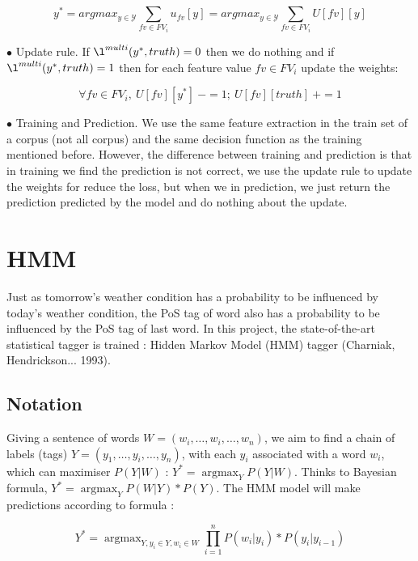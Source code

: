 \documentclass{article}
\def\YY{{\mathcal{Y}}}
\begin{document}
\begin{equation}
y^* = argmax_{y \in \YY} \sum_{fv \in FV_i} {u_{fv}[y]}
= argmax_{y \in \YY} \sum_{fv \in FV_i} {U[fv][y]}
\end{equation}

$\bullet$ Update rule. If $\l^{multi}(y^*, truth) = 0$ then we do nothing and if $\l^{multi}(y^*, truth) = 1$ then for each feature value $fv \in FV_i$ update the weights:

\begin{equation}
\forall fv \in FV_i,\  U[fv][y^*]\ -= 1;\ U[fv][truth]\ += 1
\end{equation} 

$\bullet$ Training and Prediction. We use the same feature extraction in the train set of a corpus (not all corpus) and the same decision function as the training mentioned before. However, the difference between training and prediction is that in training we find the prediction is not correct, we use the update rule to update the weights for reduce the loss, but when we in prediction, we just return the prediction predicted by the model and do nothing about the update.

\section{HMM}
Just as tomorrow's weather condition has a probability to be influenced by today's weather condition, the PoS tag of word also has a probability to be influenced by the PoS tag of last word. 
In this project, the state-of-the-art statistical tagger is trained : Hidden Markov Model (HMM) tagger (Charniak, Hendrickson... 1993).

\subsection{Notation}

Giving a sentence of words $W = (w_i,\dots,w_i,\dots,w_n)$, we aim to find a chain of labels (tags) $Y = (y_1,\dots,y_i,\dots,y_n)$, with each $y_i$ associated with a word $w_i$, which can maximiser $P(Y|W)$ : $Y^* = \mathop{\arg\max}_{Y} P(Y|W)$. Thinks to Bayesian formula, $Y^* = \mathop{\arg\max}_{Y} P(W|Y)*P(Y)$. The HMM model will make predictions according to formula :

\begin{equation}
Y^* = \mathop{\arg\max}_{Y, y_i \in Y, w_i \in W} \prod_{i=1}^n P(w_i|y_i)*P(y_i|y_{i-1})
\end{equation}
\end{document}
